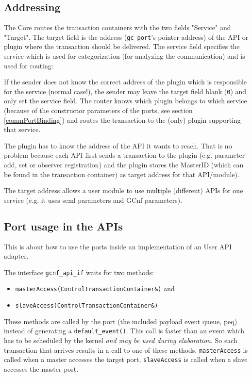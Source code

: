 \subsection{Addressing}
\label{commAddressing}
The \GreenControl Core routes the transaction containers with the two fields "Service" and "Target". The target field is the address (\lstinline|gc_port|'s pointer address) of the API or plugin where the transaction should be delivered. The service field specifies the service which is used for categorization (for analyzing the communication) and is used for routing:  

If the sender does not know the correct address of the plugin which is responsible for the service (normal case!), the sender may leave the target field blank (\lstinline|0|) and only set the service field. The router knows which plugin belongs to which service (because of the constructor parameters of the ports, see section \ref{commPortBinding}) and routes the transaction to the (only) plugin supporting that service. 

The plugin has to know the address of the API it wants to reach. That is no problem because each API first sends a transaction to the plugin (e.g. parameter add, set or observer registration) and the plugin stores the MasterID (which can be found in the transaction container) as target address for that API/module). 

The target address allows a user module to use multiple (different) APIs for one service (e.g. it uses scml parameters and GCnf parameters).  



\subsection{Port usage in the APIs}
This is about how to use the ports inside an implementation of an User API adapter. 

The interface \lstinline|gcnf_api_if| waits for two methods: 

\begin{itemize}
\item \lstinline|masterAccess(ControlTransactionContainer&)| and 

\item \lstinline|slaveAccess(ControlTransactionContainer&)| 


\end{itemize}
These methods are called by the port (the included payload event
queue, peq) instead of generating a \lstinline|default_event()|. This
call is faster than an event which has to be scheduled by the kernel
{\em and may be used during elaboration}. So each transaction that
arrives results in a call to one of these methods. \lstinline|masterAccess| is called when a master accesses the target port, \lstinline|slaveAccess| is called when a slave accesses the master port. 

